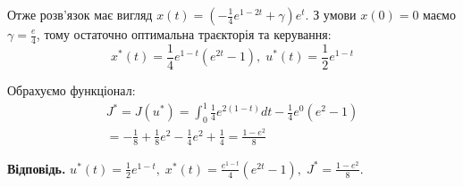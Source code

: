 \documentclass[oneside,solution]{template}
\begin{document}
Отже розв'язок має вигляд $x(t) = (-\frac{1}{4}e^{1-2t}+\gamma)e^t$. З умови $x(0)=0$ маємо $\gamma = \frac{e}{4}$, тому остаточно оптимальна траєкторія та керування:
\begin{equation}
    x^*(t) = \frac{1}{4}e^{1-t}(e^{2t}-1), \; u^*(t) = \frac{1}{2}e^{1-t}
\end{equation}

Обрахуємо функціонал:
\begin{gather}
    J^* = J(u^*) = \int_0^1 \frac{1}{4}e^{2(1-t)}dt - \frac{1}{4}e^0(e^2-1) \nonumber \\ =-\frac{1}{8} + \frac{1}{8}e^2 - \frac{1}{4}e^2 + \frac{1}{4} = \frac{1-e^2}{8}
\end{gather}

\textbf{Відповідь.} $u^*(t) = \frac{1}{2}e^{1-t}, \; x^*(t) = \frac{e^{1-t}}{4}(e^{2t}-1), \; J^* = \frac{1-e^2}{8}$.
\end{document}
